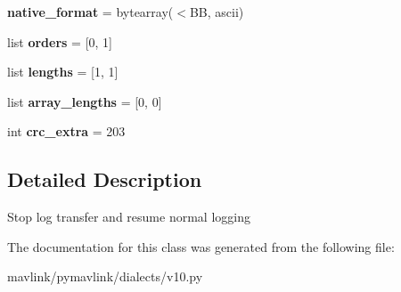\begin{DoxyCompactItemize}
{\bfseries native\+\_\+format} = bytearray(\textquotesingle{}$<$BB\textquotesingle{}, \textquotesingle{}ascii\textquotesingle{})
\item 
\mbox{\label{classpymavlink_1_1dialects_1_1v10_1_1MAVLink__log__request__end__message_a07f145caaa7e4fa7e89cd86ec19444cb}} 
list {\bfseries orders} = \mbox{[}0, 1\mbox{]}
\item 
\mbox{\label{classpymavlink_1_1dialects_1_1v10_1_1MAVLink__log__request__end__message_a5a2de2805e6f66e1a83ba3a153fbedd7}} 
list {\bfseries lengths} = \mbox{[}1, 1\mbox{]}
\item 
\mbox{\label{classpymavlink_1_1dialects_1_1v10_1_1MAVLink__log__request__end__message_a1342a677dd9049ae51ac15d7682b2274}} 
list {\bfseries array\+\_\+lengths} = \mbox{[}0, 0\mbox{]}
\item 
\mbox{\label{classpymavlink_1_1dialects_1_1v10_1_1MAVLink__log__request__end__message_a8f88a7721193b114c558315e78ac98d0}} 
int {\bfseries crc\+\_\+extra} = 203
\end{DoxyCompactItemize}


\subsection{Detailed Description}
\begin{DoxyVerb}Stop log transfer and resume normal logging
\end{DoxyVerb}
 

The documentation for this class was generated from the following file\+:\begin{DoxyCompactItemize}
\item 
mavlink/pymavlink/dialects/v10.\+py\end{DoxyCompactItemize}
